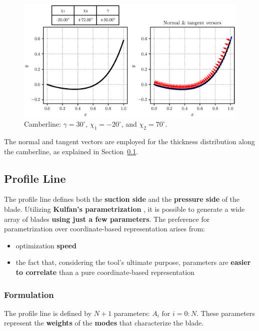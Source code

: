 \begin{figure}[!h]
  \centering
  \includegraphics[width=1\linewidth, trim=0cm 1.5cm 0cm 1cm, clip]{pyFigure/figures/cLine2.eps}
  \caption{Camberline: $\gamma = 30^{\circ}$, $\chi_1 = -20^{\circ}$, and $\chi_2 = 70^{\circ}$.}
  \label{fig:cLine2}
\end{figure}

The normal and tangent vectors are employed for the thickness distribution along the camberline, as explained in Section~\ref{sec:profileLine}.

\subsection{Profile Line}
\label{sec:profileLine}

The profile line defines both the \textbf{suction side} and the \textbf{pressure side} of the blade. Utilizing \textbf{Kulfan's parametrization} \cite{kulfan2008universal}, it is possible to generate a wide array of blades \textbf{using just a few parameters}. The preference for parametrization over coordinate-based representation arises from:

\begin{itemize} 
  \item optimization \textbf{speed} 
  \item the fact that, considering the tool's ultimate purpose, parameters are \textbf{easier to correlate} than a pure coordinate-based representation
\end{itemize}

\subsubsection{Formulation}

The profile line is defined by $N + 1$ parameters: $A_i \text{ for } i = 0:N$. These parameters represent the \textbf{weights} of the \textbf{modes} that characterize the blade.


